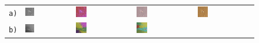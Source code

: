 \begin{figure}[h!]
	\begin{tabular}{m{15pt}m{}m{}m{}m{}}
		\texttt{a)} &
		\includegraphics[width=0.2\textwidth]{images/p03/p03_01.png} &
		\includegraphics[width=0.2\textwidth]{images/gen/pooling_layers/p03_01.png_1.png} &
		\includegraphics[width=0.2\textwidth]{images/gen/pooling_layers/p03_01.png_2.png} &
		\includegraphics[width=0.2\textwidth]{images/gen/pooling_layers/p03_01.png_4.png} \\
		\texttt{b)} &
		\includegraphics[width=0.2\textwidth]{images/p03/p03_02.png} &
		\includegraphics[width=0.2\textwidth]{images/gen/pooling_layers/p03_02.png_1.png} &
		\includegraphics[width=0.2\textwidth]{images/gen/pooling_layers/p03_02.png_2.png} &

\end{tabular}
\end{figure}
